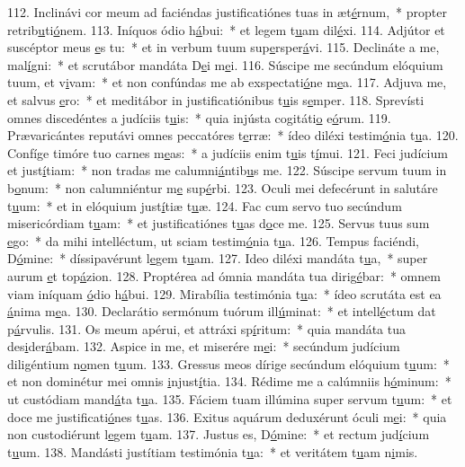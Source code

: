 112. Inclinávi cor meum ad faciéndas justificatiónes tuas in æt\uline{é}rnum,~* propter retrib\uline{u}ti\uline{ó}nem.
113. Iníquos ódio h\uline{á}bui:~* et legem t\uline{u}am dil\uline{é}xi.
114. Adjútor et suscéptor meus \uline{e}s tu:~* et in verbum tuum sup\uline{e}rsper\uline{á}vi.
115. Declináte a me, mal\uline{í}gni:~* et scrutábor mandáta D\uline{e}i m\uline{e}i.
116. Súscipe me secúndum elóquium tuum, et v\uline{i}vam:~* et non confúndas me ab exspectati\uline{ó}ne m\uline{e}a.
117. Adjuva me, et salvus \uline{e}ro:~* et meditábor in justificatiónibus t\uline{u}is s\uline{e}mper.
118. Sprevísti omnes discedéntes a judíciis t\uline{u}is:~* quia injústa cogitáti\uline{o} e\uline{ó}rum.
119. Prævaricántes reputávi omnes peccatóres t\uline{e}rræ:~* ídeo diléxi testim\uline{ó}nia t\uline{u}a.
120. Confíge timóre tuo carnes m\uline{e}as:~* a judíciis enim t\uline{u}is t\uline{í}mui.
121. Feci judícium et just\uline{í}tiam:~* non tradas me calumni\uline{á}ntib\uline{u}s me.
122. Súscipe servum tuum in b\uline{o}num:~* non calumniéntur m\uline{e} sup\uline{é}rbi.
123. Oculi mei defecérunt in salutáre t\uline{u}um:~* et in elóquium just\uline{í}tiæ t\uline{u}æ.
124. Fac cum servo tuo secúndum misericórdiam t\uline{u}am:~* et justificatiónes t\uline{u}as d\uline{o}ce me.
125. Servus tuus sum \uline{e}go:~* da mihi intelléctum, ut sciam testim\uline{ó}nia t\uline{u}a.
126. Tempus faciéndi, D\uline{ó}mine:~* díssipavérunt l\uline{e}gem t\uline{u}am.
127. Ideo diléxi mandáta t\uline{u}a,~* super aurum \uline{e}t top\uline{á}zion.
128. Proptérea ad ómnia mandáta tua dirig\uline{é}bar:~* omnem viam iníquam \uline{ó}dio h\uline{á}bui.
129. Mirabília testimónia t\uline{u}a:~* ídeo scrutáta est ea \uline{á}nima m\uline{e}a.
130. Declarátio sermónum tuórum ill\uline{ú}minat:~* et intell\uline{é}ctum dat p\uline{á}rvulis.
131. Os meum apérui, et attráxi sp\uline{í}ritum:~* quia mandáta tua des\uline{i}der\uline{á}bam.
132. Aspice in me, et miserére m\uline{e}i:~* secúndum judícium diligéntium n\uline{o}men t\uline{u}um.
133. Gressus meos dírige secúndum elóquium t\uline{u}um:~* et non dominétur mei omnis \uline{i}njust\uline{í}tia.
134. Rédime me a calúmniis h\uline{ó}minum:~* ut custódiam mand\uline{á}ta t\uline{u}a.
135. Fáciem tuam illúmina super servum t\uline{u}um:~* et doce me justificati\uline{ó}nes t\uline{u}as.
136. Exitus aquárum deduxérunt óculi m\uline{e}i:~* quia non custodiérunt l\uline{e}gem t\uline{u}am.
137. Justus es, D\uline{ó}mine:~* et rectum jud\uline{í}cium t\uline{u}um.
138. Mandásti justítiam testimónia t\uline{u}a:~* et veritátem t\uline{u}am n\uline{i}mis.
